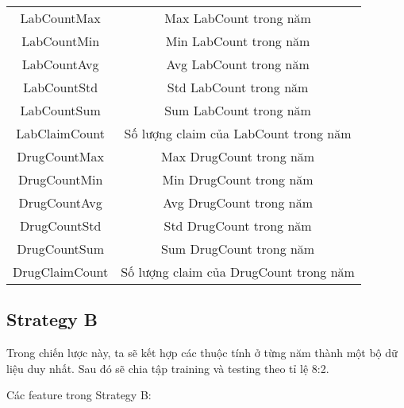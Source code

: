 \begin{longtable}[c]{| c | c |}
     LabCountMax & Max LabCount trong năm \\
     LabCountMin & Min LabCount trong năm \\
     LabCountAvg & Avg LabCount trong năm \\
     LabCountStd & Std LabCount trong năm \\
     LabCountSum & Sum LabCount trong năm \\
     LabClaimCount & Số lượng claim của LabCount trong năm \\
     DrugCountMax & Max DrugCount trong năm \\
     DrugCountMin & Min DrugCount trong năm \\
     DrugCountAvg & Avg DrugCount trong năm \\
     DrugCountStd & Std DrugCount trong năm \\
     DrugCountSum & Sum DrugCount trong năm \\
     DrugClaimCount & Số lượng claim của DrugCount trong năm \\
     \hline
\end{longtable}


\subsection{Strategy B}

Trong chiến lược này, ta sẽ kết hợp các thuộc tính ở từng năm thành một bộ dữ liệu duy nhất. Sau đó sẽ chia tập training và testing theo tỉ lệ 8:2.

Các feature trong Strategy B:

